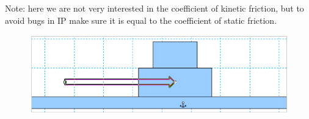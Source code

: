 Note: here we are not very interested in the coefficient of kinetic friction, but to avoid bugs in IP make sure it is equal to the coefficient of static friction.
%
\begin{figure}[H]
\includegraphics[scale=0.70]{figures/forces/fig3.png}
\end{figure}

\pagebreak \clearpage
